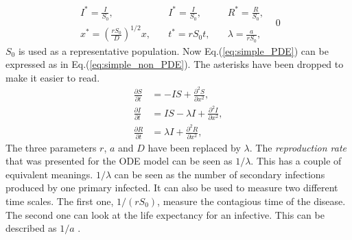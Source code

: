 \documentclass[%
twoside,                 %
final,                   %
10pt]{article}
\begin{document}
\begin{equation} \label{eq:constants_nondimensional}
	\begin{aligned}
	I^* =\frac{I}{S_0},&\quad I^* = \frac{I}{S_0},&\quad R^*= \frac{R}{S_0},&\\
	x^* =\left(\frac{rS_0}{D}\right)^{1/2}x,&\quad t^*=rS_0t,&\quad \lambda =\frac{a}{rS_0},&
	\end{aligned}
0\end{equation}
$S_0$ is used as a representative population. Now Eq.(\ref{eq:simple_PDE}) can be expressed as in Eq.(\ref{eq:simple_non_PDE}). The asterisks have been dropped to make it easier to read.
\begin{equation} \label{eq:simple_non_PDE}
	\begin{aligned}
	\frac{\partial S}{\partial t} &= -IS + \frac{\partial^2 S}{\partial x^2},\\
	\frac{\partial I}{\partial t} &= IS- \lambda I + \frac{\partial^2 I}{\partial x^2},\\
	\frac{\partial R}{\partial t} &= \lambda I + \frac{\partial^2 R}{\partial x^2},
	\end{aligned}
\end{equation}
The three parameters $r$, $a$ and $D$ have been replaced by $\lambda$. The \emph{reproduction rate} that was presented for the ODE model can be seen as $1/\lambda $. This has a couple of equivalent meanings. $1/\lambda$ can be seen as the number of secondary infections produced by one primary infected. It can also be used to measure two different time scales. The first one, $1/(rS_0)$, measure the contagious time of the disease. The second one can look at the life expectancy for an infective. This can be described as $1/a$ \cite{murray2003mathematical}. 
\end{document}
